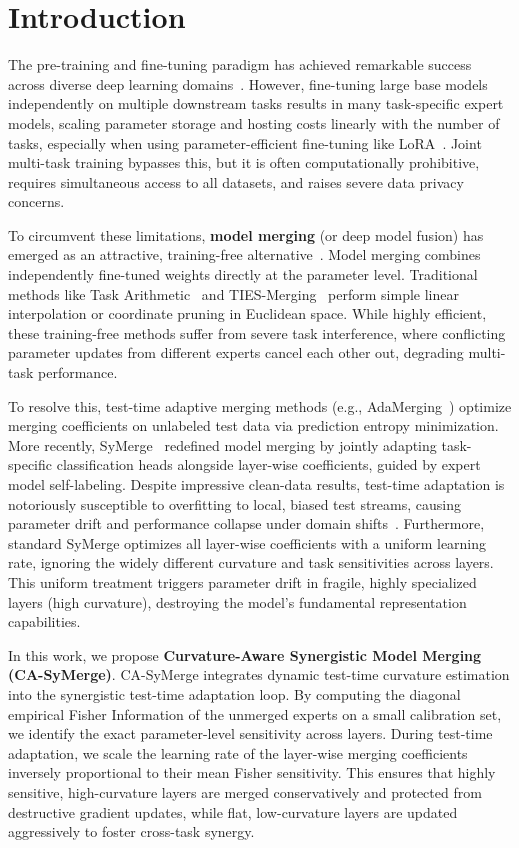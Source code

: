 \documentclass{article}
\begin{document}
\section{Introduction}
\label{sec:intro}
The pre-training and fine-tuning paradigm has achieved remarkable success across diverse deep learning domains~\cite{devlin18,vaswani17,he16}. However, fine-tuning large base models independently on multiple downstream tasks results in many task-specific expert models, scaling parameter storage and hosting costs linearly with the number of tasks, especially when using parameter-efficient fine-tuning like LoRA~\cite{hu21}. Joint multi-task training bypasses this, but it is often computationally prohibitive, requires simultaneous access to all datasets, and raises severe data privacy concerns.

To circumvent these limitations, \textbf{model merging} (or deep model fusion) has emerged as an attractive, training-free alternative~\cite{wortsman22,ilharco22}. Model merging combines independently fine-tuned weights directly at the parameter level. Traditional methods like Task Arithmetic~\cite{ilharco22} and TIES-Merging~\cite{yadav23} perform simple linear interpolation or coordinate pruning in Euclidean space. While highly efficient, these training-free methods suffer from severe task interference, where conflicting parameter updates from different experts cancel each other out, degrading multi-task performance.

To resolve this, test-time adaptive merging methods (e.g., AdaMerging~\cite{yang24}) optimize merging coefficients on unlabeled test data via prediction entropy minimization. More recently, SyMerge~\cite{jung24} redefined model merging by jointly adapting task-specific classification heads alongside layer-wise coefficients, guided by expert model self-labeling. Despite impressive clean-data results, test-time adaptation is notoriously susceptible to overfitting to local, biased test streams, causing parameter drift and performance collapse under domain shifts~\cite{song23}. Furthermore, standard SyMerge optimizes all layer-wise coefficients with a uniform learning rate, ignoring the widely different curvature and task sensitivities across layers. This uniform treatment triggers parameter drift in fragile, highly specialized layers (high curvature), destroying the model's fundamental representation capabilities.

In this work, we propose \textbf{Curvature-Aware Synergistic Model Merging (CA-SyMerge)}. CA-SyMerge integrates dynamic test-time curvature estimation into the synergistic test-time adaptation loop. By computing the diagonal empirical Fisher Information of the unmerged experts on a small calibration set, we identify the exact parameter-level sensitivity across layers. During test-time adaptation, we scale the learning rate of the layer-wise merging coefficients inversely proportional to their mean Fisher sensitivity. This ensures that highly sensitive, high-curvature layers are merged conservatively and protected from destructive gradient updates, while flat, low-curvature layers are updated aggressively to foster cross-task synergy.
\end{document}
